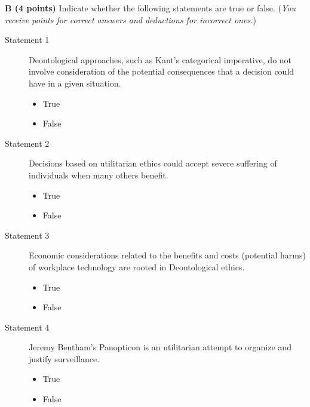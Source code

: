 \documentclass[12pt]{scrartcl}
\begin{document}
\vspace{0.3cm}
\newpage
\textbf{B (4 points)} Indicate whether the following statements are true or false. (\textit{You receive points for correct answers and deductions for incorrect ones.})
\\
\begin{description}
	\item[Statement 1] Deontological approaches, such as Kant's categorical imperative, do not involve consideration of the potential consequences that a decision could have in a given situation.

\begin{multicols}{2}
	\begin{itemize}[label={\Square}]
		\item True
		\item False
	\end{itemize}
\end{multicols}

\item[Statement 2] Decisions based on utilitarian ethics could accept severe suffering of individuals when many others benefit.

\begin{multicols}{2}
	\begin{itemize}[label={\Square}]
		\item True
		\item False
	\end{itemize}
\end{multicols}

\item[Statement 3] Economic considerations related to the benefits and costs (potential harms) of workplace technology are rooted in Deontological ethics.

\begin{multicols}{2}
	\begin{itemize}[label={\Square}]
		\item True
		\item False
	\end{itemize}
\end{multicols}

\item[Statement 4] Jeremy Bentham's Panopticon is an utilitarian attempt to organize and justify surveillance.

\begin{multicols}{2}
	\begin{itemize}[label={\Square}]
		\item True
		\item False
	\end{itemize}
\end{multicols}

\end{description}
\end{document}
